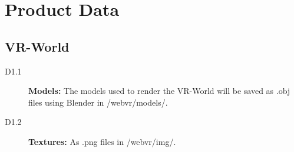 \section{Product Data}

\subsection{VR-World}

\begin{description}
  \item[D1.1] \textbf{Models:} The models used to render the VR-World will be saved as .obj files using Blender in /webvr/models/.
  \item[D1.2] \textbf{Textures:} As .png files in /webvr/img/.
\end{description}

